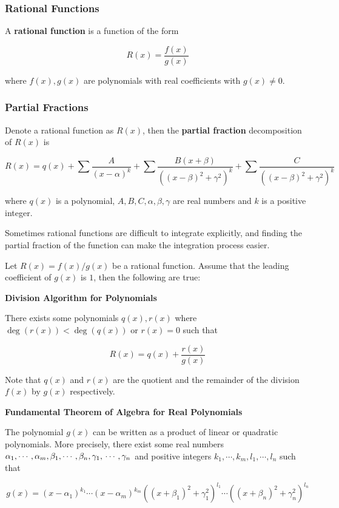\documentclass[a4paper,12pt]{article}
\begin{document}
\subsubsection{Rational Functions}
\begin{dft}
  A \textbf{rational function} is a function of the form

  $$R(x)=\frac{f(x)}{g(x)}$$

  where $f(x),g(x)$ are polynomials with real coefficients with $g(x)\neq 0$.
\end{dft}

\subsubsection{Partial Fractions}
\begin{dft}
  Denote a rational function as $R(x)$, then the \textbf{partial fraction} decomposition of $R(x)$ is

  $$R(x)=q(x)+\sum\frac{A}{(x-\alpha)^{k}}+\sum\frac{B(x+\beta)}{((x-\beta)^{2}+\gamma^{2})^{k}}+\sum\frac{C}{((x-\beta)^{2}+\gamma^{2})^{k}}$$\s

  where $q(x)$ is a polynomial, $A,B,C,\alpha,\beta,\gamma$ are real numbers and $k$ is a positive integer.
\end{dft}\n

Sometimes rational functions are difficult to integrate explicitly, and finding the partial fraction of the function can make the integration process easier.\n

\begin{thm}
  Let $R(x)=f(x)/g(x)$ be a rational function. Assume that the leading coefficient of $g(x)$ is $1$, then the following are true:

  \begin{alist}
    \item \textbf{Division Algorithm for Polynomials}\n

    There exists some polynomials $q(x),r(x)$ where $\deg(r(x))<\deg(q(x))$ or $r(x)=0$ such that

    $$R(x)=q(x)+\frac{r(x)}{g(x)}$$\s

    Note that $q(x)$ and $r(x)$ are the quotient and the remainder of the division $f(x)$ by $g(x)$ respectively.

    \item \textbf{Fundamental Theorem of Algebra for Real Polynomials}\n

    The polynomial $g(x)$ can be written as a product of linear or quadratic polynomials. More precisely, there exist some real numbers $\alpha_{1},\cdots,\alpha_{m},\beta_{1},\cdots,\beta_{n},\gamma_{1},\\\cdots,\gamma_{n}$ and positive integers $k_{1},\cdots,k_{m},l_{1},\cdots,l_{n}$ such that

    $$g(x)=(x-\alpha_{1})^{k_{1}}\cdots(x-\alpha_{m})^{k_{m}}((x+\beta_{1})^{2}+\gamma_{1}^{2})^{l_{1}}\cdots((x+\beta_{n})^{2}+\gamma_{n}^{2})^{l_{n}}$$
  \end{alist}
\end{thm}\n
\end{document}
